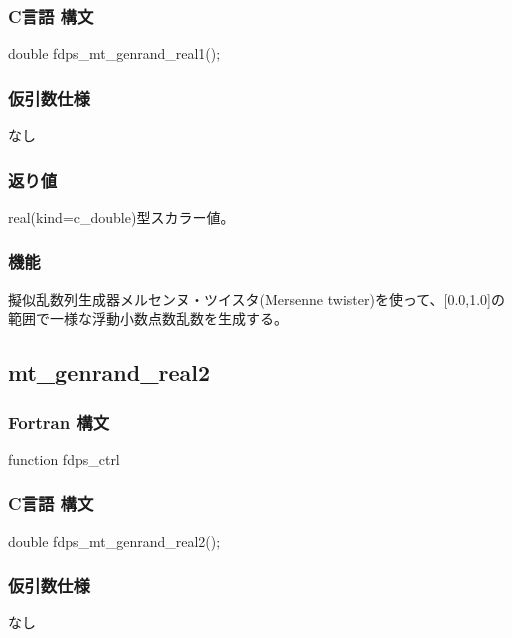 \subsubsection*{C言語 構文}
\begin{screen}
\begin{spverbatim}
double fdps_mt_genrand_real1();
\end{spverbatim}
\end{screen}


\subsubsection*{仮引数仕様}
なし

\subsubsection*{返り値}
real(kind=c\_double)型スカラー値。

\subsubsection*{機能}
擬似乱数列生成器メルセンヌ・ツイスタ(Mersenne twister)を使って、[0.0,1.0]の範囲で一様な浮動小数点数乱数を生成する。
\clearpage

\subsection{mt\_genrand\_real2}
\subsubsection*{Fortran 構文}
\begin{screen}
\begin{spverbatim}
function fdps_ctrl%
\end{spverbatim}
\end{screen}

\subsubsection*{C言語 構文}
\begin{screen}
\begin{spverbatim}
double fdps_mt_genrand_real2();
\end{spverbatim}
\end{screen}


\subsubsection*{仮引数仕様}
なし

